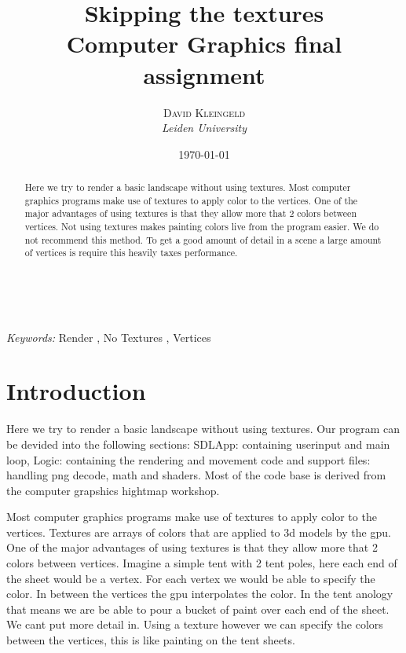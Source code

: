 \documentclass[a4paper, 11pt]{article} %
\title{\textbf{Skipping the textures}\\ %
Computer Graphics final assignment} %
\author{\textsc{David Kleingeld} %
\\{\textit{Leiden University}}} %
\date{\today} %
\makeatletter
\renewcommand{\maketitle}{ %
\begin{flushright} %
{\LARGE\@title} %

\vspace{50pt} %

{\large\@author} %
\\\@date %

\vspace{40pt} %
\end{flushright}
}
\makeatother
\begin{document}
\maketitle %



\begin{abstract}
Here we try to render a basic landscape without using textures. Most computer graphics programs make use of textures to apply color to the vertices. One of the major advantages of using textures is that they allow more that 2 colors between vertices. Not using textures makes painting colors live from the program easier. We do not recommend this method. To get a good amount of detail in a scene a large amount of vertices is require this heavily taxes performance.
\end{abstract}

\hspace*{3,6mm}\textit{Keywords:} Render , No Textures , Vertices %

\vspace{30pt} %


\section*{Introduction}
Here we try to render a basic landscape without using textures. Our program can be devided into the following sections: SDLApp: containing userinput and main loop, Logic: containing the rendering and movement code and support files: handling png decode, math and shaders. Most of the code base is derived from the computer grapshics hightmap workshop.

Most computer graphics programs make use of textures to apply color to the vertices. Textures are arrays of colors that are applied to 3d models by the gpu. One of the major advantages of using textures is that they allow more that 2 colors between vertices. Imagine a simple tent with 2 tent poles, here each end of the sheet would be a vertex. For each vertex we would be able to specify the color. In between the vertices the gpu interpolates the color. In the tent anology that means we are be able to pour a bucket of paint over each end of the sheet. We cant put more detail in. Using a texture however we can specify the colors between the vertices, this is like painting on the tent sheets.
\end{document}
